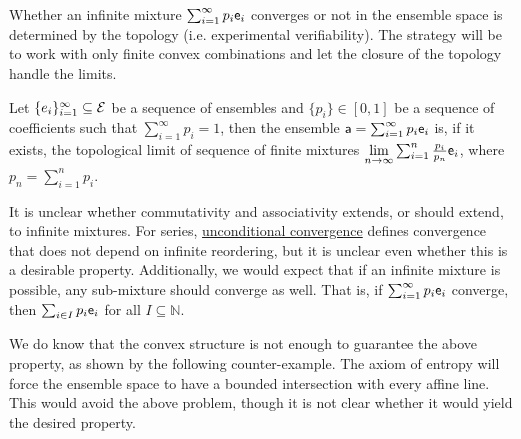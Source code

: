 Whether an infinite mixture $\sum_{i=1}^\infty p_i \ens_i$ converges or not in the ensemble space is determined by the topology (i.e. experimental verifiability). The strategy will be to work with only finite convex combinations and let the closure of the topology handle the limits.

\begin{mathSection}
\begin{defn}
	Let $\{e_i\}_{i=1}^{\infty} \subseteq \Ens$ be a sequence of ensembles and $\{p_i\} \in [0,1]$ be a sequence of coefficients such that $\sum_{i=1}^{\infty} p_i = 1$, then the ensemble $\ens[a] = \sum_{i=1}^{\infty} p_i \ens_i$ is, if it exists, the topological limit of sequence of finite mixtures $\lim\limits_{n\to\infty} \sum_{i=1}^{n} \frac{p_i}{p_n} \ens_i$, where $p_n = \sum_{i=1}^{n} p_i$.
\end{defn}
\end{mathSection}

It is unclear whether commutativity and associativity extends, or should extend, to infinite mixtures. For series, \href{https://en.wikipedia.org/wiki/Unconditional_convergence}{unconditional convergence} defines convergence that does not depend on infinite reordering, but it is unclear even whether this is a desirable property. Additionally, we would expect that if an infinite mixture is possible, any sub-mixture should converge as well. That is, if $\sum_{i=1}^{\infty} p_i \ens_i$ converge, then $\sum_{i \in I} p_i \ens_i$ for all $I \subseteq \mathbb{N}$.

We do know that the convex structure is not enough to guarantee the above property, as shown by the following counter-example. The axiom of entropy will force the ensemble space to have a bounded intersection with every affine line. This would avoid the above problem, though it is not clear whether it would yield the desired property.


